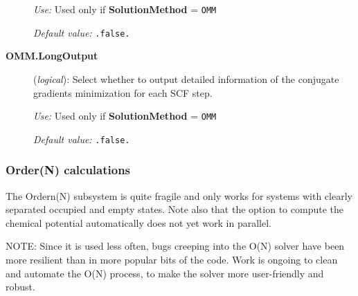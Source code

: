 \begin{description}
\textit{Use:} Used only if \textbf{SolutionMethod} = \texttt{OMM}

\textit{Default value:} \texttt{.false.}

\item[\textbf{OMM.LongOutput}] (\textit{logical}):
Select whether to output detailed information of the conjugate gradients minimization for each
SCF step.

\textit{Use:} Used only if \textbf{SolutionMethod} = \texttt{OMM}

\textit{Default value:} \texttt{.false.}

\end{description}


\subsubsection{Order(N) calculations} \label{SolverON}

The Ordern(N) subsystem is quite fragile and only works for systems
with clearly separated occupied and empty states. Note also that the
option to compute the chemical potential automatically does not yet
work in parallel.

NOTE: Since it is used less often, bugs creeping into the O(N) solver have
been more resilient than in more popular bits of the code.  Work is
ongoing to clean and automate the O(N) process, to make the solver
more user-friendly and robust.

